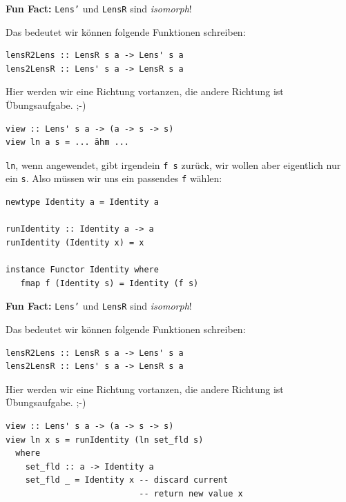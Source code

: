 \documentclass{beamer}
\begin{document}

\begin{frame}[fragile]

\textbf{Fun Fact:} \texttt{Lens'} und \texttt{LensR} sind \emph{isomorph}!
\pause
\smallskip\smallskip

Das bedeutet wir können folgende Funktionen schreiben:

\begin{verbatim}
lensR2Lens :: LensR s a -> Lens' s a
lens2LensR :: Lens' s a -> LensR s a
\end{verbatim}
\pause

Hier werden wir eine Richtung vortanzen, die andere Richtung ist Übungsaufgabe. ;-)

\begin{verbatim}
view :: Lens' s a -> (a -> s -> s)
view ln a s = ... ähm ...
\end{verbatim}
\pause

\texttt{ln}, wenn angewendet, gibt irgendein \texttt{f s} zurück, wir wollen aber eigentlich nur ein \texttt{s}. \pause
Also müssen wir uns ein passendes \texttt{f} wählen:

\begin{verbatim}
newtype Identity a = Identity a

runIdentity :: Identity a -> a 
runIdentity (Identity x) = x

instance Functor Identity where
   fmap f (Identity s) = Identity (f s)
\end{verbatim}
 
\end{frame}


\begin{frame}[fragile]

\textbf{Fun Fact:} \texttt{Lens'} und \texttt{LensR} sind \emph{isomorph}!
\smallskip\smallskip

Das bedeutet wir können folgende Funktionen schreiben:

\begin{verbatim}
lensR2Lens :: LensR s a -> Lens' s a
lens2LensR :: Lens' s a -> LensR s a
\end{verbatim}

Hier werden wir eine Richtung vortanzen, die andere Richtung ist Übungsaufgabe. ;-)

\begin{verbatim}
view :: Lens' s a -> (a -> s -> s)
view ln x s = runIdentity (ln set_fld s)
  where
    set_fld :: a -> Identity a
    set_fld _ = Identity x -- discard current
                           -- return new value x
\end{verbatim}
\pause
 
\end{frame}
\end{document}

